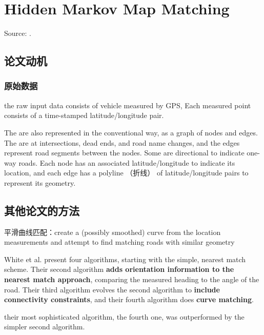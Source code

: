 \chapter{Hidden Markov Map Matching}

Source: \cite{newson2009hidden}.

\section{论文动机}

\subsection{原始数据}

the raw input
data consists of vehicle  measured by GPS, Each measured point consists of a time-stamped
latitude/longitude pair. 

The  are also represented in the
conventional way, as a graph of nodes and edges.
The  are at
intersections, dead ends, and road name changes, and the edges
represent road segments between the nodes. Some  are
directional to indicate one-way roads. Each node has an associated
latitude/longitude to indicate its location, and each edge has a
polyline （折线） of latitude/longitude pairs to represent its geometry.

\section{其他论文的方法}

平滑曲线匹配：create a (possibly smoothed) curve
from the location measurements and attempt to find matching
roads with similar geometry

\begin{example}
White et al. 
present four algorithms, starting with the simple, nearest match
scheme. 
Their second algorithm \textbf{adds orientation information to
the nearest match approach}, comparing the measured heading to
the angle of the road. Their third algorithm evolves the second
algorithm to \textbf{include connectivity constraints}, and their fourth
algorithm does \textbf{curve matching}. 

\begin{remark}
    their most sophisticated algorithm, the fourth one, was
outperformed by the simpler second algorithm.
\end{remark}
\end{example}


